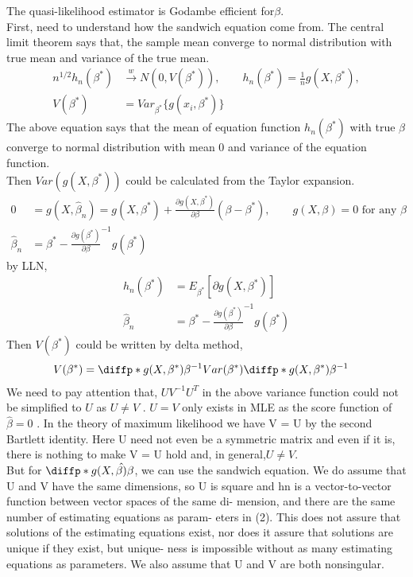 \documentclass{article}
\begin{document}
 

The quasi-likelihood estimator is Godambe efficient for$\beta$.\\
First, need to understand how the sandwich equation come from. The central limit theorem says that, the sample mean converge to normal distribution with true mean and variance of the true mean. 
\begin{align*}
   n^{1/2} h_n(\beta^{\ast}) & \xrightarrow{w} N (0, V(\beta^{\ast})), \qquad h_n(\beta^{\ast}) = \frac{1}{n} g(X, \beta^{\ast}), \\
   V(\beta^{\ast}) &=   Var_{\beta^{\ast}}\{ g(x_i, \beta^{\ast})\}
\end{align*} 
The above equation says that the mean of equation function $h_n(\beta^{\ast})$ with true $\beta$ converge to normal distribution with mean 0 and variance of the equation function.\\
Then $Var(g(X, \beta^{\ast}))$ could be calculated from the Taylor expansion.
\begin{align*}
 0 &= g(X, \hat{\beta}_n) = g(X,\beta^{\ast}) + \frac{\partial g(X, \beta^{\ast})}{\partial \beta} (\beta - \beta^{\ast}), \qquad g(X, \beta) = 0 \text{ for any }\beta\\
 \hat{\beta}_n &=  \beta^{\ast} - \frac{\partial g(\beta^{\ast})}{\partial \beta}^{-1} g(\beta^{\ast})
\end{align*}
 by LLN,
 \begin{align*}
 h_n(\beta^{\ast}) &= E_{\beta^{\ast}} [\partial g(X, \beta^{\ast})]\\
 \hat{\beta}_n &=  \beta^{\ast} - \frac{\partial g(\beta^{\ast})}{\partial \beta}^{-1} g(\beta^{\ast})
\end{align*}
 Then $V(\beta^{\ast})$ could be written by delta method,
 \begin{align*}
 V(\beta^{\ast}) &= \diffp*{g(X, \beta^{\ast})}{\beta}{}^{-1} Var(\beta^{\ast}) \diffp*{g(X, \beta^{\ast})}{\beta}{}^{-1}
\end{align*}
We need to pay attention that, $UV^{-1}U^T$ in the above variance function could not be simplified to $U$ as $U \neq V$ .
$U=V$ only exists in MLE as the score function of $\hat{\beta} = 0$ . In the theory of maximum likelihood we have V = U by the second Bartlett identity. Here U need not even be a symmetric matrix and even if it is, there is nothing to make V = U hold and, in general,$U \neq V$.\\

But for $\diffp*{g(X, \hat{\beta)}}{\beta}{}$, we can use the sandwich equation.
We do assume that U and V have the same dimensions, so U is square
and hn is a vector-to-vector function between vector spaces of the same di-
mension, and there are the same number of estimating equations as param-
eters in (2). This does not assure that solutions of the estimating equations
exist, nor does it assure that solutions are unique if they exist, but unique-
ness is impossible without as many estimating equations as parameters. We
also assume that U and V are both nonsingular.\\
\end{document}
